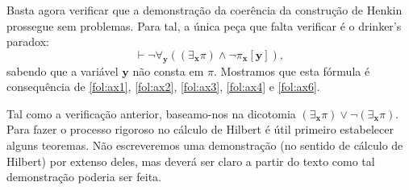 \documentclass{report}
\theoremstyle{definition}
\theoremstyle{remark}
\renewcommand{\bf}[1]{\mathbf{#1}}
\begin{document}
	Basta agora verificar que a demonstração da coerência da construção de Henkin prossegue sem problemas. Para tal, a única peça que falta verificar é o drinker's paradox:
	\[\vdash \neg \forall_{\bf y} ( (\exists_{\bf x} \pi) \land \neg \pi_{\bf x}[\bf y]),\]
	sabendo que a variável $\bf y$ não consta em $\pi$. Mostramos que esta fórmula é consequência de \eqref{fol:ax1}, \eqref{fol:ax2}, \eqref{fol:ax3}, \eqref{fol:ax4} e \eqref{fol:ax6}.

	Tal como a verificação anterior, baseamo-nos na dicotomia $(\exists_{\bf x} \pi) \lor \neg (\exists_{\bf x} \pi)$. Para fazer o processo rigoroso no cálculo de Hilbert é útil primeiro estabelecer alguns teoremas. Não escreveremos uma demonstração (no sentido de cálculo de Hilbert) por extenso deles, mas deverá ser claro a partir do texto como tal demonstração poderia ser feita.
\end{document}

